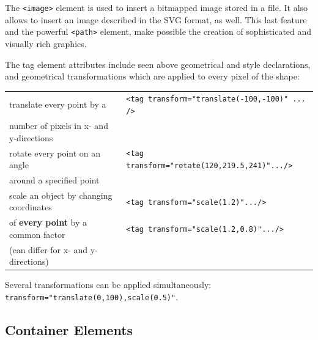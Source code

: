 \documentclass[a4paper]{article}
\begin{document}
The \verb!<image>! element is used to insert a bitmapped image stored in a file. It also allows 
to insert an image described in the SVG format, as well. This last feature and
the powerful \verb!<path>! element, make possible the creation of sophisticated and
visually rich graphics.

The tag element attributes include seen above geometrical and style declarations, and  geometrical transformations which are applied to every pixel of the shape:

\begin{center}
\begin{tabular}{|l|l|}
        \hline
        translate every point by a & \verb!<tag transform="translate(-100,-100)" ... />!\\
        number of pixels in x- and y-directions & \\ 
        \hline
        rotate every point on an angle & \verb!<tag transform="rotate(120,219.5,241)".../>!\\
        around a specified point & \\
        \hline
        scale an object by changing coordinates & \verb!<tag transform="scale(1.2)".../>!\\
        of \textbf{every point} by a common factor & \verb!<tag transform="scale(1.2,0.8)".../>!\\
        (can differ for x- and y-directions) & \\
        \hline
\end{tabular}
\end{center}

Several transformations can be applied simultaneously:
\verb!transform="translate(0,100),scale(0.5)"!.

\subsection*{Container Elements} %
\label{sub:container_elements}
\end{document}
